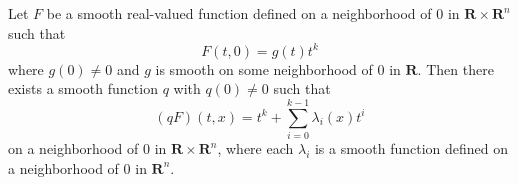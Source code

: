 Let $F$ be a smooth real-valued function defined on a neighborhood of $0$ in $\mathbf{R} \times \mathbf{R}^n$ such that
$$F(t, 0) = g(t)t^k$$
where $g(0) \neq 0$ and $g$ is smooth on some neighborhood of $0$ in $\mathbf{R}$. Then there exists a smooth function $q$ with $q(0) \neq 0$ such that
$$(qF)(t, x) = t^k + \sum_{i=0}^{k-1} \lambda_i(x) t^i$$
on a neighborhood of $0$ in $\mathbf{R} \times \mathbf{R}^n$, where each $\lambda_i$ is a smooth function defined on a neighborhood of $0$ in $\mathbf{R}^n$.